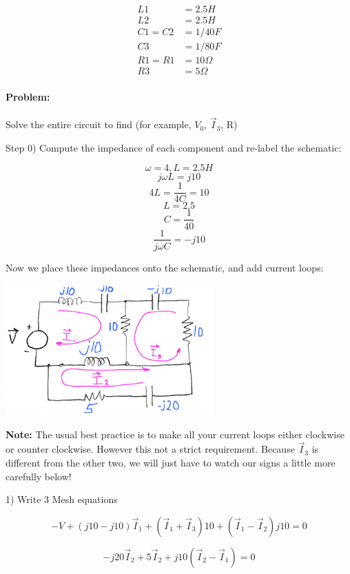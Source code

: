 \begin{align*}
L1 &= 2.5 H\\
L2 &= 2.5 H\\
C1 = C2 &= 1/40 F\\
C3 &= 1/80 F\\
R1 = R1 &= 10\Omega\\
R3 &= 5\Omega
\end{align*}

\paragraph{Problem:} Solve the entire circuit to find (for example, $V_0$, $\vec{I}_3$, R)
\vspace{0.2in}

Step 0)  Compute the impedance of each component and re-label the schematic:


\[\omega = 4, L = 2.5H
\]
\[j\omega L =  j10
\]
\[4L = \frac{1}{4C} = 10
\]
\[L = 2.5
\]
\[
C = \frac{1}{40}
\]
\[
\frac{1}{j\omega C} = -j10
\]


Now we place these impedances onto the schematic, and add current loops:

\vspace{0.2in}
\includegraphics[width=0.6\textwidth]{figsChapt02/LK37610.png} %

{\bf Note: }   The usual best practice is to make all your current loops either
clockwise or counter clockwise.   However this not a strict requirement.  Because
$\vec I_3 $ is different from the other two, we will just have to watch our signs
a little more carefully below!


\vspace{0.2in}
1) Write 3 Mesh equations

  \[
  -V + (j10 - j10)\vec{I}_1 + (\vec I_1 + \vec{I}_3)10 + (\vec{I}_1 - \vec{I}_2)j10 = 0
  \]

  \[
  -j20\vec{I}_2 + 5\vec{I}_2 + j10(\vec{I}_2 - \vec{I}_1) = 0
  \]

